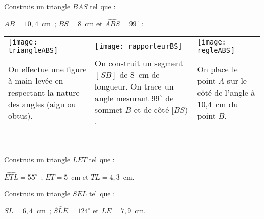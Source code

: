 \begin{methode*1}

 \begin{exemple*1}
Construis un triangle $BAS$ tel que :

$AB = 10,4$ cm ; $BS = 8$ cm et $\widehat{ABS} = 99^\circ$ : \\[1em]
\begin{tabularx}{\textwidth}{X|X|X}
 \texttt{[image: triangleABS]} &  \texttt{[image: rapporteurBS]} & \texttt{[image: regleABS]} \\ 
 On effectue une figure à main levée en respectant la nature des angles (aigu ou obtus). & On construit un segment $[SB]$ de 8 cm de longueur. On trace un angle mesurant $99^\circ$ de sommet $B$ et de côté $[BS)$. & On place le point $A$ sur le côté de l'angle à 10,4 cm du point $B$. \\
\end{tabularx} \\

\end{exemple*1}

\exercice
Construis un triangle $LET$ tel que :

$\widehat{ETL} = 55^\circ$ ; $ET = 5$ cm et $TL = 4,3$ cm.

\exercice
Construis un triangle $SEL$ tel que :

$SL = 6,4$ cm ; $\widehat{SLE}= 124^\circ$ et $LE = 7,9$ cm.
 
\end{methode*1}



